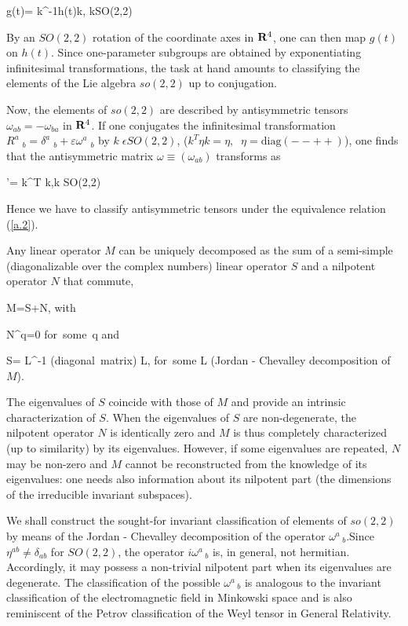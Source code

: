 \bb
g(t)= k^{-1}h(t)k,\;\;\; k\epsilon SO(2,2)
\label{a.1}
\ee

By an $SO(2,2)$ rotation of the coordinate axes in ${\bf R}^4$,
one can then map $g(t)$ on $h(t)$. Since one-parameter subgroups are
obtained by exponentiating infinitesimal transformations, the
task at hand amounts to classifying the elements of the Lie
algebra $so(2,2)$ up to conjugation.

Now, the elements of $so(2,2)$ are described by antisymmetric
tensors $\omega_{ab} =-\omega_{ba}$ in ${\bf R}^4$. If one
conjugates the infinitesimal transformation $R^a\;_b =
\delta^a\;_b +\varepsilon \omega^a\;_b$ by $k \; \epsilon
SO(2,2)$, ($k^T \eta k = \eta,\;\; \eta= \mbox{diag}(--++)$),
one finds that the antisymmetric matrix $\omega \equiv
(\omega_{ab})$ transforms as

\bb
\omega\rightarrow  \omega'= k^T \omega k,\;\;k \epsilon SO(2,2)
\label{a.2}
\ee

Hence we have to classify antisymmetric tensors under the
equivalence relation (\ref{a.2}).
\vspace{1cm}



Any linear operator $M$ can be uniquely decomposed as the sum of
a semi-simple (diagonalizable over the complex numbers) linear
operator $S$ and a nilpotent operator $N$ that commute,

\bb
M=S+N,
\label{a.3}
\ee
{}
\label{a.4}
\ee
%
with

\bb
N^q=0 \;\;\; \mbox{for some q}
\label{a.5}
\ee
%
and

\bb
S= L^{-1} (\mbox{diagonal matrix}) L,\;\; \mbox{for some}\; L
\label{a.6}
\ee
%
(Jordan - Chevalley decomposition of $M$).

The eigenvalues of $S$ coincide with those of $M$ and provide an
intrinsic characterization of $S$. When the eigenvalues of $S$
are non-degenerate, the nilpotent operator $N$ is identically
zero and $M$ is thus completely characterized (up to similarity)
by its eigenvalues.  However, if some eigenvalues are repeated,
$N$ may be non-zero and $M$ cannot be reconstructed from the
knowledge of its eigenvalues: one needs also information about
its nilpotent part (the dimensions of the irreducible invariant
subspaces).

We shall construct the sought-for invariant classification of
elements of $so(2,2)$ by means of the Jordan - Chevalley
decomposition of the operator $\omega^a\,_b$.Since
$\eta^{ab}\neq \delta_{ab}$ for $SO(2,2)$, the operator
$i\omega^a\,_b$ is, in general, not hermitian. Accordingly, it
may possess a non-trivial nilpotent part when its eigenvalues
are degenerate. The classification of the possible $\omega^a\,_b$
is analogous to the invariant classification of the
electromagnetic field in Minkowski space and is also reminiscent
of the Petrov classification of the Weyl tensor in General
Relativity.

